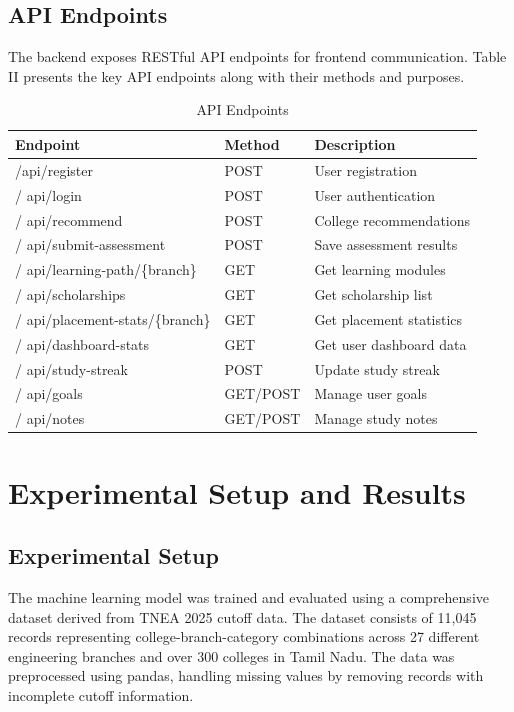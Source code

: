 \documentclass[journal]{IEEEtran}
\begin{document}
\subsection{API Endpoints}
The backend exposes RESTful API endpoints for frontend communication. Table II presents the key API endpoints along with their methods and purposes.

\begin{table}[htbp]
\caption{API Endpoints}
\begin{center}
\begin{tabular}{lll}
\hline
\textbf{Endpoint} & \textbf{Method} & \textbf{Description} \\
\hline
/api/register & POST & User registration \\
/ api/login & POST & User authentication \\
/ api/recommend & POST & College recommendations \\
/ api/submit-assessment & POST & Save assessment results \\
/ api/learning-path/\{branch\} & GET & Get learning modules \\
/ api/scholarships & GET & Get scholarship list \\
/ api/placement-stats/\{branch\} & GET & Get placement statistics \\
/ api/dashboard-stats & GET & Get user dashboard data \\
/ api/study-streak & POST & Update study streak \\
/ api/goals & GET/POST & Manage user goals \\
/ api/notes & GET/POST & Manage study notes \\
\hline
\end{tabular}
\label{tab2}
\end{center}
\end{table}

\section{Experimental Setup and Results}

\subsection{Experimental Setup}
The machine learning model was trained and evaluated using a comprehensive dataset derived from TNEA 2025 cutoff data. The dataset consists of 11,045 records representing college-branch-category combinations across 27 different engineering branches and over 300 colleges in Tamil Nadu. The data was preprocessed using pandas, handling missing values by removing records with incomplete cutoff information.
\end{document}
